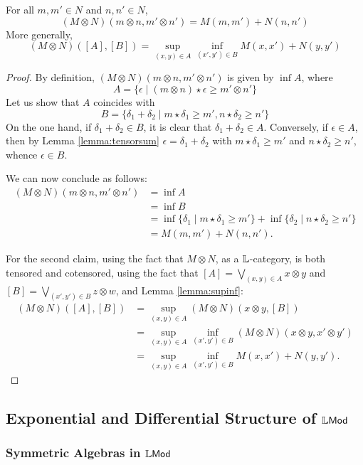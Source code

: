 \begin{proposition}\label{prop:tensormetric}
For all $m,m'\in N$ and $n,n'\in N$, 
$$
(M\otimes  N)(m\otimes  n, m'\otimes n')= M(m,m') +N(n,n')
$$
More generally, 
$$
(M\otimes N)([A],[B])= \sup_{(x,y)\in A}\inf_{(x',y')\in B}M(x,x')+N(y,y')
$$
\end{proposition}
\begin{proof}
By definition, $(M\otimes  N)(m\otimes  n, m'\otimes n')$ is given by $\inf A$, where
$$
A=\{ \epsilon \mid (m\otimes n)\star\epsilon \geq m'\otimes n'\}
$$
Let us show that $A$ coincides with 
$$
B=\{ \delta_{1}+\delta_{2} \mid m\star\delta_{1} \geq  m', n\star \delta_{2}\geq n'\}$$
On the one hand, if $\delta_{1}+\delta_{2}\in B$, it is clear that $\delta_{1}+\delta_{2}\in A$. Conversely, if $\epsilon\in A$, then by Lemma \ref{lemma:tensorsum} $\epsilon=\delta_{1}+\delta_{2}$ with $m\star\delta_{1}\geq m'$ and $n\star \delta_{2}\geq n'$, whence 
$\epsilon \in B$. 

We can now conclude as follows:
\begin{align*}
(M\otimes  N)(m\otimes  n, m'\otimes n')& =\inf A \\
&= \inf B \\
&= \inf \{ \delta_{1} \mid m\star\delta_{1} \geq  m'\}
+ \inf\{ \delta_{2} \mid  n\star \delta_{2}\geq n'\}\\
&= M(m,m')+N(n,n').
\end{align*}


For the second claim, using the fact that $M\otimes N$, as a $\mathbb{L}$-category, is both tensored and cotensored, using the fact that 
$[A]=\bigvee_{(x,y)\in A}x\otimes y$ and $[B]=\bigvee_{(x',y')\in B}z\otimes w$, and Lemma \ref{lemma:supinf}:
\begin{align*}
(M\otimes  N)([A],[B])&=
\sup_{(x,y)\in A}(M\otimes N)(x\otimes y, [B]) \\
&=\sup_{(x,y)\in A}\inf_{(x',y')\in B}(M\otimes N)(x\otimes y, x'\otimes y') 
\\
&=
\sup_{(x,y)\in A} \inf_{(x',y')\in B}M(x,x')+N(y,y').
\end{align*}
\end{proof}


\subsection{Exponential and Differential Structure of $\mathbb{L}\mathsf{Mod}$}

\subsubsection{Symmetric Algebras in $\mathbb{L}\mathsf{Mod}$ }

